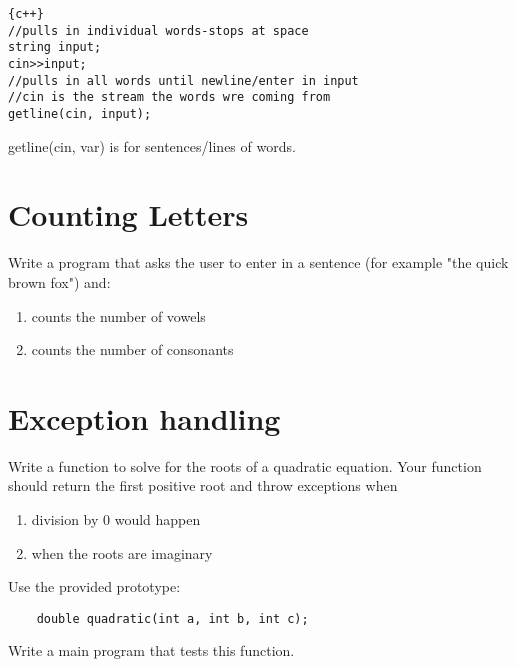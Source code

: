 \documentclass{article}
\begin{document}
\begin{lstlisting}{c++}
//pulls in individual words-stops at space
string input;    
cin>>input;
//pulls in all words until newline/enter in input
//cin is the stream the words wre coming from
getline(cin, input);
\end{lstlisting}
 getline(cin, var) is for sentences/lines of words.

\section*{Counting Letters}
Write a program that asks the user to enter in a sentence (for example "the quick brown fox") and:
\begin{enumerate}
	\item counts the number of vowels
	\item counts the number of consonants
\end{enumerate}

\section*{Exception handling}
Write a function to solve for the roots of a quadratic equation. Your function should return the first positive root and throw exceptions when 
\begin{enumerate}
	\item division by 0 would happen
	\item when the roots are imaginary
\end{enumerate}
 Use the provided prototype:
\begin{lstlisting}
	double quadratic(int a, int b, int c);
\end{lstlisting}
Write a main program that tests this function. 
\end{document}
